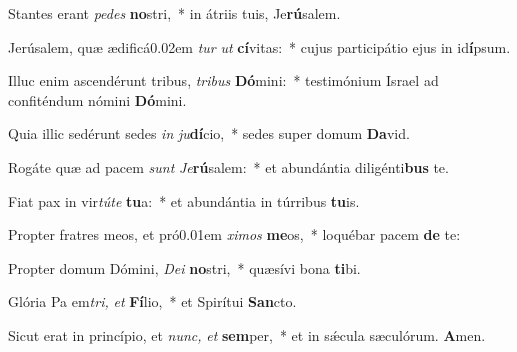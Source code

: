 \item Stantes erant \textit{pe}\textit{des} \textbf{no}stri,~* in átriis tuis, Je\textbf{rú}salem.
\item Jerúsalem, quæ ædificá\kern 0.02em \textit{tur} \textit{ut} \textbf{cí}vitas:~* cujus participátio ejus in id\textbf{í}psum.
\item Illuc enim ascendérunt tribus, \textit{tribus} \textbf{Dó}mini:~* testimónium Israel ad confiténdum nómini \textbf{Dó}mini.
\item Quia illic sedérunt sedes \textit{in} \textit{ju}\textbf{dí}cio,~* sedes super domum \textbf{Da}vid.
\item Rogáte quæ ad pacem \textit{sunt} \textit{Je}\textbf{rú}salem:~* et abundántia diligénti\textbf{bus} te.
\item Fiat pax in vir\textit{túte} \textbf{tu}a:~* et abundántia in túrribus \textbf{tu}is.
\item Propter fratres meos, et pró\kern 0.01em \textit{ximos} \textbf{me}os,~* loquébar pacem \textbf{de} te:
\item Propter domum Dómini, \textit{De}\textit{i} \textbf{no}stri,~* quæsívi bona \textbf{ti}bi.
\item Glória Pa em\textit{tri,} \textit{et} \textbf{Fí}lio,~* et Spirítui \textbf{San}cto.
\item Sicut erat in princípio, et \textit{nunc,} \textit{et} \textbf{sem}per,~* et in sǽcula sæculórum. \textbf{A}men.
